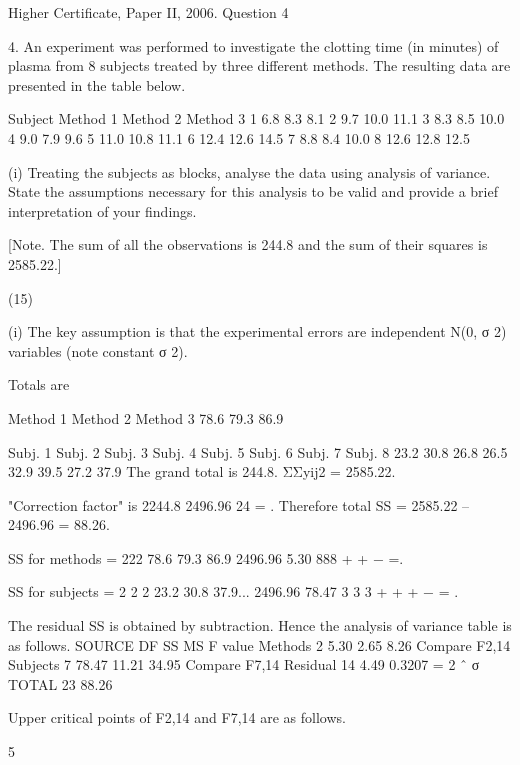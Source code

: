 \documentclass[a4paper,12pt]{article}
\begin{document}
Higher Certificate, Paper II, 2006.  Question 4 
 \begin{framed}
 4. An experiment was performed to investigate the clotting time (in minutes) of plasma from 8 subjects treated by three different methods.  The resulting data are presented in the table below. 
 
Subject Method 1 Method 2 Method 3 1   6.8   8.3   8.1 2   9.7 10.0 11.1 3   8.3   8.5 10.0 4   9.0   7.9   9.6 5 11.0 10.8 11.1 6 12.4 12.6 14.5 7   8.8   8.4 10.0 8 12.6 12.8 12.5 
 
 
(i) Treating the subjects as blocks, analyse the data using analysis of variance.  State the assumptions necessary for this analysis to be valid and provide a brief interpretation of your findings. 
 
[Note.  The sum of all the observations is 244.8 and the sum of their squares is 2585.22.] 
 
(15) 
 
 

 \end{framed}
 
(i) The key assumption is that the experimental errors are independent N(0, σ 2) variables (note constant σ 2). 
 
Totals are 
 
Method 1 Method 2 Method 3 78.6 79.3 86.9 
 
Subj. 1 Subj. 2 Subj. 3 Subj. 4 Subj. 5 Subj. 6 Subj. 7 Subj. 8 23.2 30.8 26.8 26.5 32.9 39.5 27.2 37.9 
 The grand total is 244.8.     ΣΣyij2 = 2585.22. 
 
"Correction factor" is 
2244.8 2496.96 24 = . 
 Therefore total SS = 2585.22 – 2496.96 = 88.26. 
 
SS for methods = 
222 78.6 79.3 86.9 2496.96 5.30 888 + + − =. 
 
SS for subjects = 
2 2 2 23.2 30.8 37.9... 2496.96 78.47 3 3 3 + + + − = . 
 
 
The residual SS is obtained by subtraction. 
 Hence the analysis of variance table is as follows. 
 SOURCE DF SS MS F value Methods   2   5.30   2.65        8.26   Compare F2,14 Subjects   7 78.47 11.21      34.95   Compare F7,14 Residual 14   4.49 0.3207 = 2 ˆ σ
 TOTAL 23 88.26   
 
 
Upper critical points of F2,14 and F7,14 are as follows. 
 
 5%
 
 
 
 
 
\end{document}
